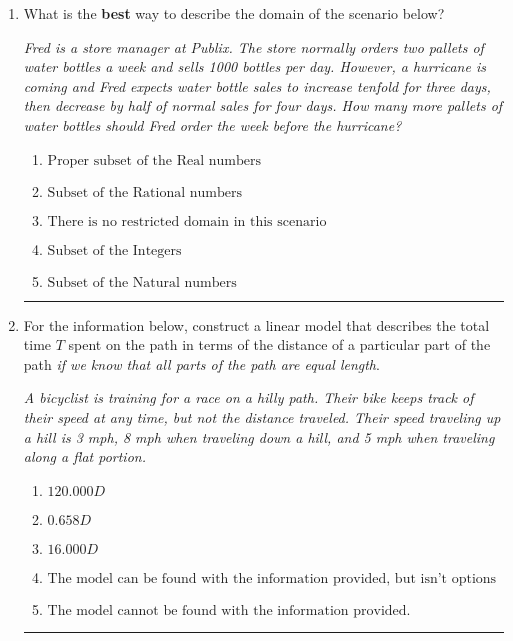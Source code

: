 \documentclass[14pt]{extbook}
\newcommand{\litem}[1]{\item#1\hspace*{-1cm}\rule{\textwidth}{0.4pt}}
\begin{document}
\begin{enumerate}
{\begin{enumerate}[label=\Alph*.]
\end{enumerate} }
\litem{
What is the \textbf{best} way to describe the domain of the scenario below?
\begin{center}
    \textit{ Fred is a store manager at Publix. The store normally orders two pallets of water bottles a week and sells 1000 bottles per day. However, a hurricane is coming and Fred expects water bottle sales to increase tenfold for three days, then decrease by half of normal sales for four days. How many more pallets of water bottles should Fred order the week before the hurricane? }
\end{center}
\begin{enumerate}[label=\Alph*.]
\item \( \text{Proper subset of the Real numbers} \)
\item \( \text{Subset of the Rational numbers} \)
\item \( \text{There is no restricted domain in this scenario} \)
\item \( \text{Subset of the Integers} \)
\item \( \text{Subset of the Natural numbers} \)

\end{enumerate} }
\litem{
For the information below, construct a linear model that describes the total time $T$ spent on the path in terms of the distance of a particular part of the path \textit{if we know that all parts of the path are equal length}.
\begin{center}
    \textit{ A bicyclist is training for a race on a hilly path. Their bike keeps track of their speed at any time, but not the distance traveled. Their speed traveling up a hill is 3 mph, 8 mph when traveling down a hill, and 5 mph when traveling along a flat portion. }
\end{center}
\begin{enumerate}[label=\Alph*.]
\item \( 120.000 D \)
\item \( 0.658 D \)
\item \( 16.000 D \)
\item \( \text{The model can be found with the information provided, but isn't options 1-3.} \)
\item \( \text{The model cannot be found with the information provided.} \)


\end{enumerate}}
\end{enumerate}
\end{document}
